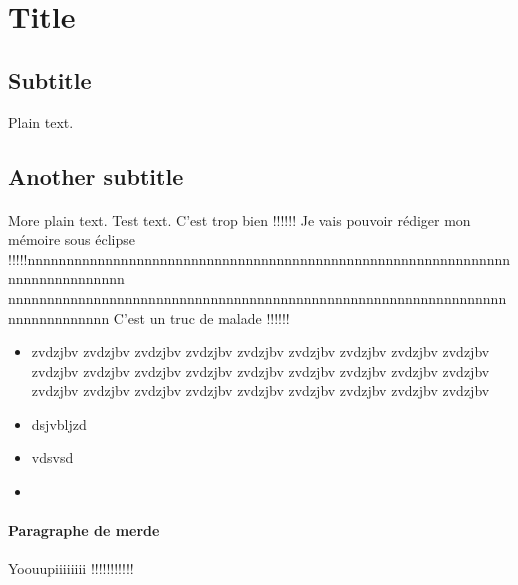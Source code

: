 \documentclass[a4paper, 12pt]{article}
\begin{document}
\section{Title}

\subsection{Subtitle}

Plain text.

\subsection{Another subtitle}
\paragraph{}
More plain text. Test text.
C'est trop bien !!!!!!  Je vais pouvoir rédiger mon mémoire sous éclipse
!!!!!nnnnnnnnnnnnnnnnnnnnnnnnnnnnnnnnnnnnnnnnnnnnnnnnnnnnnnnnnnnnnnnnnnnnnnnnnnnnn
nnnnnnnnnnnnnnnnnnnnnnnnnnnnnnnnnnnnnnnnnnnnnnnnnnnnnnnnnnnnnnnnnnnnnnnnnnnnn C'est un truc de malade !!!!!!

\begin{itemize}
  \item zvdzjbv zvdzjbv zvdzjbv zvdzjbv zvdzjbv zvdzjbv zvdzjbv zvdzjbv zvdzjbv
  zvdzjbv zvdzjbv zvdzjbv zvdzjbv zvdzjbv zvdzjbv zvdzjbv zvdzjbv zvdzjbv
  zvdzjbv zvdzjbv zvdzjbv zvdzjbv zvdzjbv zvdzjbv zvdzjbv zvdzjbv zvdzjbv 
  \item dsjvbljzd
  \item vdsvsd
  
  
  \item 
\end{itemize}

\paragraph{Paragraphe de merde}
Yoouupiiiiiiii !!!!!!!!!!!
\end{document}
